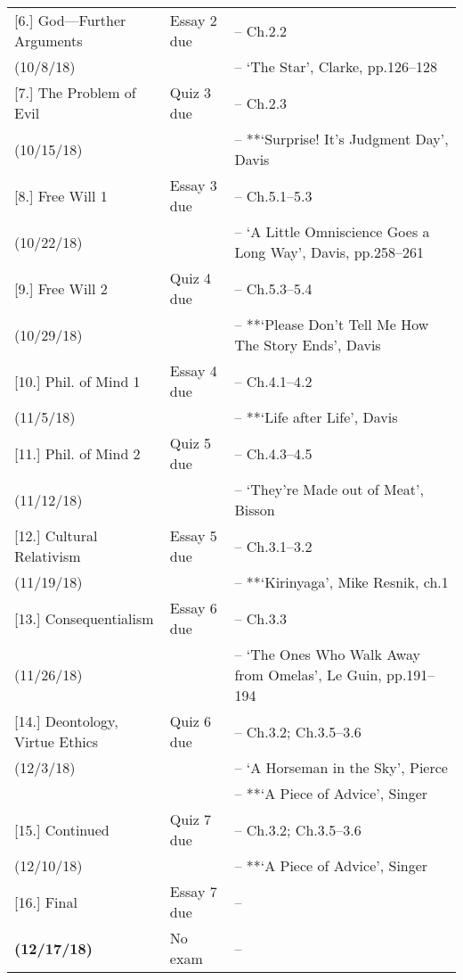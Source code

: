 \documentclass[article,oneside]{memoir}
\begin{document}
\begin{center}
\begin{longtable}{p{4.5cm}p{2cm}>{-- }p{6cm}}
[6.] God---Further Arguments	& Essay 2	 due		&   Ch.2.2\\
(10/8/18)					&				& `The Star', Clarke, pp.126--128\\ [1.8\baselineskip]

[7.] The Problem of Evil 		& Quiz 3	due		& Ch.2.3\\
(10/15/18)					& 				& **`Surprise! It's Judgment Day',  Davis\\  [1.8\baselineskip]		

[8.] Free Will 1 				& Essay 3	 due		& Ch.5.1--5.3 \\
(10/22/18)					&				&  `A Little Omniscience Goes a Long Way', Davis, pp.258--261 \\  [1.8\baselineskip]

[9.] Free Will 2 				& Quiz 4	due		&  Ch.5.3--5.4\\
(10/29/18)					&				& **`Please Don't Tell Me How The Story Ends', Davis \\  [1.8\baselineskip]

[10.] Phil. of Mind 1			& Essay 4	due			& Ch.4.1--4.2 \\
(11/5/18)					&					& **`Life after Life', Davis\\ [1.8\baselineskip]
						
[11.] Phil. of Mind 2 			& Quiz 5	due			& Ch.4.3--4.5 \\
(11/12/18)					&					& `They're Made out of Meat', Bisson \\ [1.8\baselineskip]
 

[12.] Cultural Relativism 		& Essay 5	due			& Ch.3.1--3.2\\
(11/19/18)					&					& **`Kirinyaga', Mike Resnik, ch.1 \\ [1.8\baselineskip]


[13.] Consequentialism 		& Essay 6	due			&  Ch.3.3 \\ 
(11/26/18)					&					& `The Ones Who Walk Away from Omelas', Le Guin, pp.191--194 \\ [1.8\baselineskip]
						
[14.] Deontology, Virtue Ethics 	& Quiz 6	due			&  Ch.3.2;  Ch.3.5--3.6\\
(12/3/18)					&					&  `A Horseman in the Sky', Pierce \\ 
 				 		&					&  **`A Piece of Advice', Singer \\  [1.8\baselineskip]

[15.] Continued				& Quiz 7 due			& Ch.3.2;  Ch.3.5--3.6 \\ 
(12/10/18)					&					& **`A Piece of Advice', Singer \\  [1.8\baselineskip]

[16.] Final 		& Essay 7 due		&  \\ 
\textbf{(12/17/18)}			& No exam	& \\  
\end{longtable}
\end{center}
\end{document}
